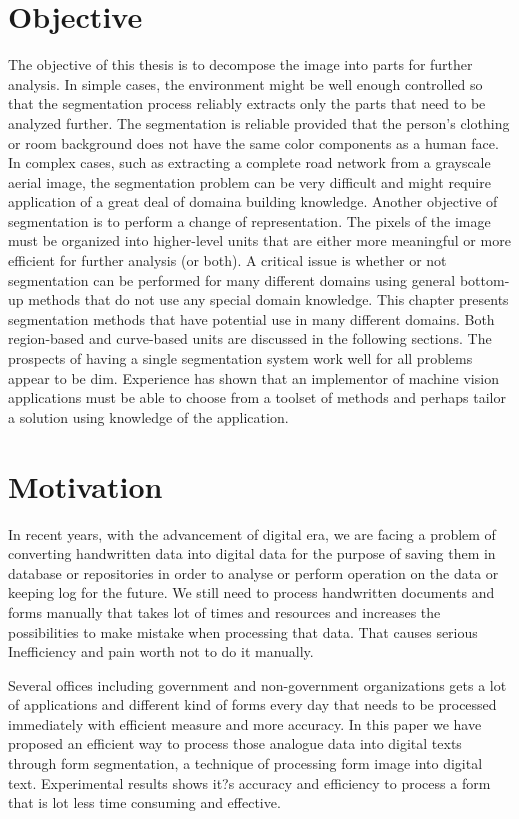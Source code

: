 \section{Objective}
The objective of this thesis is to decompose the image into parts for further analysis. In simple cases, the environment might be well enough controlled so that the segmentation process reliably extracts only the parts that need to be analyzed further. The segmentation is reliable provided that the person's clothing or room background does not have the same color components as a human face. In complex cases, such as extracting a complete road network from a grayscale aerial image, the segmentation problem can be very difficult and might require application of a great deal of domaina building knowledge.
Another objective of segmentation is to perform a change of representation. The pixels of the image must be organized into higher-level units that are either more meaningful or more efficient for further analysis (or both). A critical issue is whether or not segmentation can be performed for many different domains using general bottom-up methods that do not use any special domain knowledge. This chapter presents segmentation methods that have potential use in many different domains. Both region-based and curve-based units are discussed in the following sections. The prospects of having a single segmentation system work well for all problems appear to be dim. Experience has shown that an implementor of machine vision applications must be able to choose from a toolset of methods and perhaps tailor a solution using knowledge of the application.
\section{Motivation}
In recent years, with the advancement of digital era, we are facing a problem of converting handwritten data into digital data for the purpose of saving them in database or repositories in order to analyse or perform operation on the data or keeping log for the future. We still need to process handwritten documents and forms manually that takes lot of times and resources and increases the possibilities to make mistake when processing that data. That causes serious Inefficiency and pain worth not to do it manually.

Several offices including government and non-government organizations gets a lot of applications and different kind of forms every day that needs to be processed immediately with efficient measure and more accuracy. 
In this paper we have proposed an efficient way to process those analogue data into digital texts through form segmentation, a technique of processing form image into digital text. Experimental results shows it?s accuracy and efficiency to process a form that is lot less time consuming and effective.  


